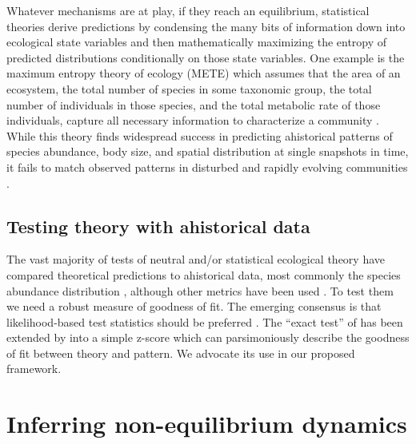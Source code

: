 \documentclass[12pt]{article}
\begin{document}
Whatever mechanisms are at play, if they reach an equilibrium, statistical theories derive predictions by condensing the many bits of information down into ecological state
variables \citep{Harte2011-um} and then mathematically maximizing the entropy of predicted distributions conditionally on those state variables. One example is the maximum entropy theory of ecology (METE)
which assumes that the area of an ecosystem, the total number of
species in some taxonomic group, the total number of individuals in
those species, and the total metabolic rate of those individuals,
capture all necessary information to characterize a community \citep{Harte2011-um}. While this
theory finds widespread success in predicting ahistorical patterns of
species abundance, body size, and spatial distribution \citep{Harte2011-um,
  White2012-yw, Xiao2015-jv} at single snapshots in
time, it fails to match observed patterns in disturbed and rapidly
evolving communities \citep{Rominger2015-kb, Harte2011-um}.

\subsection{Testing theory with ahistorical data}

The vast majority of tests of neutral and/or statistical ecological
theory have compared theoretical predictions to ahistorical data, most
commonly the species abundance distribution \citep{Hubbell2001-dx,
  Harte2011-um, White2012-yw}, although other metrics have been used
\citep[e.g.,][]{Xiao2015-jv}. To test them we need a robust measure of
goodness of fit. The emerging consensus is that
likelihood-based test statistics should be preferred
\citep{baldridge2016}. The ``exact test'' of \citep{etienne2007} has
been extended by \citep{meteR} into a simple z-score which can
parsimoniously describe the goodness of fit between theory and
pattern.  We advocate its use in our proposed framework.


\section{Inferring non-equilibrium dynamics}
\end{document}
